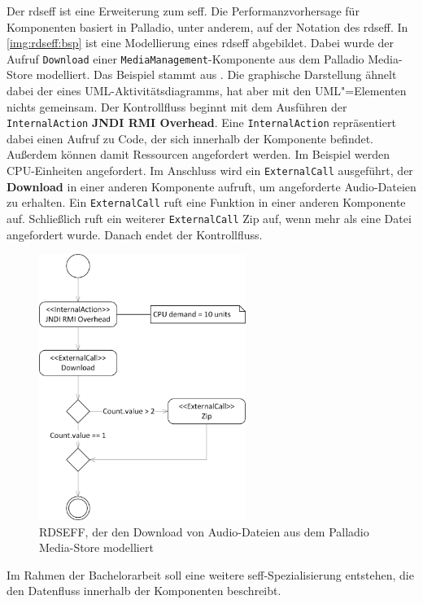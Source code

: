 Der \gls{rdseff} ist eine Erweiterung zum \gls{seff}. Die Performanzvorhersage für Komponenten basiert in Palladio, unter anderem, auf der Notation des \gls{rdseff}. In \autoref{img:rdseff:bsp} ist eine Modellierung eines \gls{rdseff} abgebildet. Dabei wurde der Aufruf \texttt{Download} einer \texttt{MediaManagement}-Komponente aus dem Palladio Media-Store modelliert. Das Beispiel stammt aus \cite{Reussner}. Die graphische Darstellung ähnelt dabei der eines UML-Aktivitätsdiagramms, hat aber mit den UML"=Elementen nichts gemeinsam. Der Kontrollfluss beginnt mit dem Ausführen der \texttt{InternalAction} \textbf{JNDI RMI Overhead}. Eine \texttt{InternalAction} repräsentiert dabei einen Aufruf zu Code, der sich innerhalb der Komponente befindet. Außerdem können damit Ressourcen angefordert werden. Im Beispiel werden CPU-Einheiten angefordert. Im Anschluss wird ein \texttt{ExternalCall} ausgeführt, der \textbf{Download} in einer anderen Komponente aufruft, um angeforderte Audio-Dateien zu erhalten. Ein \texttt{ExternalCall} ruft eine Funktion in einer anderen Komponente auf. Schließlich ruft ein weiterer \texttt{ExternalCall} Zip auf, wenn mehr als eine Datei angefordert wurde. Danach endet der Kontrollfluss.
\begin{figure}[h]
	\centering
  	\includegraphics[width=0.6\textwidth]{images/rdseff_bsp.png}
	\caption{RDSEFF, der den Download von Audio-Dateien aus dem Palladio Media-Store modelliert}
	\label{img:rdseff:bsp}
\end{figure} \par
Im Rahmen der Bachelorarbeit soll eine weitere \gls{seff}-Spezialisierung entstehen, die den Datenfluss innerhalb der Komponenten beschreibt.

